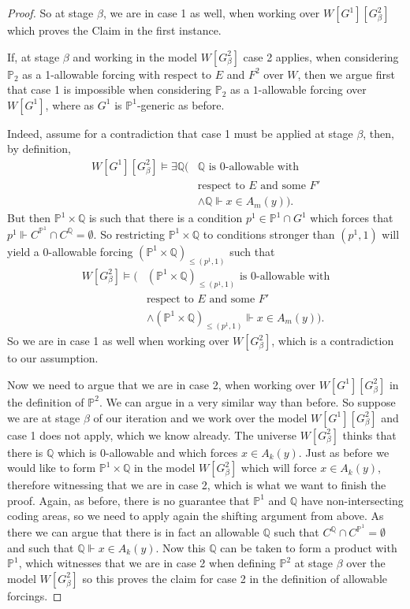 \documentclass[10pt,a4paper]{amsart}
\newcommand{\forceP}{\mathbb{P}}
\newcommand{\forceQ}{\mathbb{Q}}
\begin{document}
\begin{proof}
So at stage $\beta$, we are in case 1 as well, when working over $W[G^1][G^2_{\beta}]$ which proves the Claim in the first instance.

If, at stage $\beta$ and working in the model $W[G_{\beta}^2]$ case 2 applies, when considering $ \forceP_2$ as a 1-allowable forcing with respect to $E$ and $F^2$ over $W$, then we argue first that case 1 is impossible when considering $\forceP_2$ as a $1$-allowable forcing over $W[G^1]$, where as $G^1$ is $\forceP^1$-generic as before.


Indeed, assume for a contradiction that case 1 must be applied at stage $\beta$, then, by definition,
\begin{align*}
W [G^1] [G^2_{\beta}] \models  \exists \forceQ (&\forceQ \text{ is } 0 \text{-allowable with} \\&
\text{respect to } E \text{ and some $F'$}  \\&  \land
\forceQ \Vdash {x} \in A_m({y})).
\end{align*}
But then $\forceP^1 \times \forceQ$ is such that there is a condition $p^1 \in \forceP^1 \cap G^1$ which forces that $p^1 \Vdash C^{\forceP^1} \cap C^{\forceQ} = \emptyset$. So restricting $\forceP^1 \times \forceQ$ to conditions stronger than $(p^1,1)$ will yield a $0$-allowable forcing $(\forceP^1 \times \forceQ)_{\le (p^1,1)} $ such that 
\begin{align*}
W [G^2_{\beta}] \models  (&(\forceP^1 \times \forceQ)_{\le (p^1,1)} \text{ is } 0 \text{-allowable with} \\&
\text{respect to } E \text{ and some $F'$ }  \\&  \land
(\forceP^1 \times \forceQ)_{\le (p^1,1)} \Vdash {x} \in A_m({y})).
\end{align*}
So we are in case 1 as well when working over $W [G^2_{\beta}]$, which is a contradiction to our assumption.

Now we need to argue that we are in case 2, when working over $W[G^1][G^2_{\beta}]$ in the definition of $\forceP^2$. We can argue in a very similar way than before. So suppose we are at stage $\beta$ of our iteration and we work over the model $W[G^1][G^2_{\beta}]$ and case 1 does not apply, which we know already. The universe $W[G^2_{\beta}]$ thinks that there is $\forceQ$ which is 0-allowable and which forces $x \in A_k(y)$. Just as before we would like to form $\forceP^1 \times \forceQ$ in the model $W[G^2_{\beta}]$ which will force $x \in A_k(y)$, therefore witnessing that we are in case 2, which is what we want to finish the proof. Again, as before, there is no guarantee that $\forceP^1$ and $\forceQ$ have non-intersecting coding areas, so we need to apply again the shifting argument from above.
As there we can argue that there is in fact an allowable $\forceQ$ such that $C^{\forceQ} \cap C^{\forceP^1}= \emptyset$ and such that $\forceQ \Vdash x \in A_k (y)$. Now this $\forceQ$ can be taken to form a product with $\forceP^1$, which witnesses that we are in case 2 when defining $\forceP^2$ at stage $\beta$ over the model $W[G^2_{\beta}]$ so this proves the claim for case 2 in the definition of allowable forcings.


\end{proof}
\end{document}
